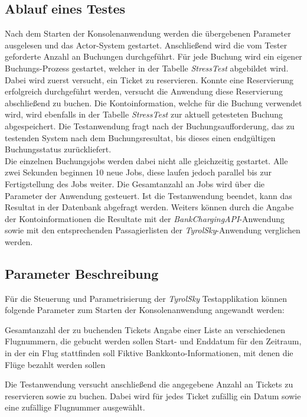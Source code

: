 \subsection{Ablauf eines Testes}
Nach dem Starten der Konsolenanwendung werden die übergebenen Parameter ausgelesen und das Actor-System gestartet. Anschließend wird die vom Tester geforderte Anzahl an Buchungen durchgeführt. Für jede Buchung wird ein eigener Buchungs-Prozess gestartet, welcher in der Tabelle \textit{StressTest} abgebildet wird. Dabei wird zuerst versucht, ein Ticket zu reservieren. Konnte eine Reservierung erfolgreich durchgeführt werden, versucht die Anwendung diese Reservierung abschließend zu buchen. Die Kontoinformation, welche für die Buchung verwendet wird, wird ebenfalls in der Tabelle \textit{StressTest} zur aktuell getesteten Buchung abgespeichert. Die Testanwendung fragt nach der Buchungsaufforderung, das zu testenden System nach dem Buchungsresultat, bis dieses einen endgültigen Buchungsstatus zurückliefert. \\
% 
% 
Die einzelnen Buchungsjobs werden dabei nicht alle gleichzeitig gestartet. Alle zwei Sekunden beginnen 10 neue Jobs, diese laufen jedoch parallel bis zur Fertigstellung des Jobs weiter. Die Gesamtanzahl an Jobs wird über die Parameter der Anwendung gesteuert. Ist die Testanwendung beendet, kann das Resultat in der Datenbank abgefragt werden. Weiters können durch die Angabe der Kontoinformationen die Resultate mit der \textit{BankChargingAPI}-Anwendung sowie mit den entsprechenden Passagierlisten der \textit{TyrolSky}-Anwendung verglichen werden.

\subsection{Parameter Beschreibung}
Für die Steuerung und Parametrisierung der \textit{TyrolSky} Testapplikation können folgende Parameter zum Starten der Konsolenanwendung angewandt werden:

\begin{itemize}
     Gesamtanzahl der zu buchenden Tickets
     Angabe einer Liste an verschiedenen Flugnummern, die gebucht werden sollen
     Start- und Enddatum für den Zeitraum, in der ein Flug stattfinden soll
     Fiktive Bankkonto-Informationen, mit denen die Flüge bezahlt werden sollen
\end{itemize}
Die Testanwendung versucht anschließend die angegebene Anzahl an Tickets zu reservieren sowie zu buchen. Dabei wird für jedes Ticket zufällig ein Datum sowie eine zufällige Flugnummer ausgewählt. 
